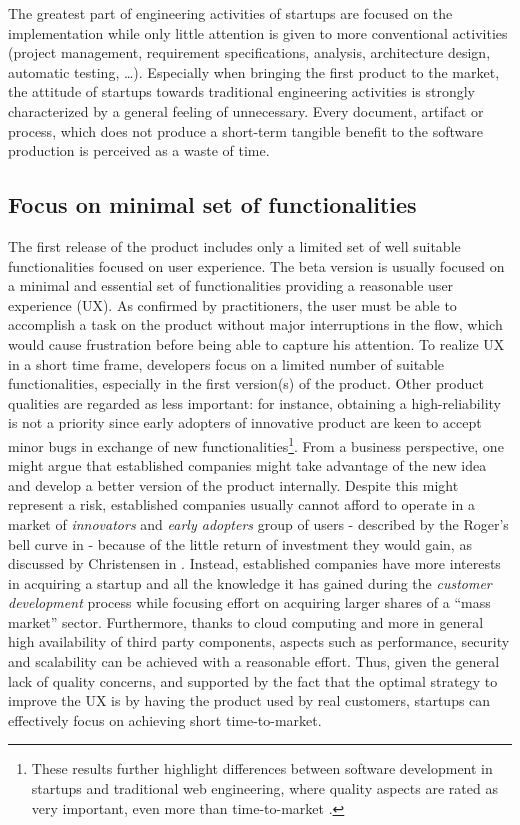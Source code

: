 \documentclass[10pt,journal,letterpaper,compsoc]{IEEEtran}
\begin{document}
The greatest part of engineering activities of startups are focused on 
the implementation while only little attention is given to more conventional 
activities (project management, requirement specifications, analysis, 
architecture design, automatic testing, \ldots). Especially when bringing the 
first product to the market, the attitude of startups towards traditional 
engineering activities is strongly characterized by a general feeling of 
unnecessary. Every document, artifact or process, which does not produce a 
short-term tangible benefit to the software production is perceived as a waste 
of time. 

\subsection{Focus on minimal set of functionalities}
The first release of the product includes only a limited set of well 
suitable functionalities focused on user experience. The beta version is usually 
focused on a minimal and essential set of functionalities providing a reasonable 
user experience (UX). As confirmed by practitioners, the user must be able to 
accomplish a task on the product without major interruptions in the flow, which 
would cause frustration before being able to capture his attention. To realize 
UX in a short time frame, developers focus on a limited number of suitable 
functionalities, especially in the first version(s) of the product. Other 
product qualities are regarded as less important: for instance, obtaining a 
high-reliability is not a priority since early adopters of innovative product 
are keen to accept minor bugs in exchange of new functionalities\footnote{These 
results further highlight differences between software development in startups 
and traditional web engineering, where quality aspects are rated as very 
important, even more than time-to-market \cite{Offutt2002}.}. From a business 
perspective, one might argue that established companies might take advantage of 
the new idea and develop a better version of the product internally. Despite 
this might represent a risk, established companies usually cannot afford to 
operate in a market of \textit{innovators} and \textit{early adopters} group of 
users - described by the Roger's bell curve in \cite{Rogers} - because of the 
little return of investment they would gain, as discussed by Christensen in 
\cite{Christensen2003}. Instead, established companies have more interests in 
acquiring a startup and all the knowledge it has gained during the 
\textit{customer development} process while focusing effort on acquiring larger 
shares of a ``mass market'' sector. Furthermore, thanks to cloud computing and 
more in general high availability of third party components, aspects such as 
performance, security and scalability can be achieved with a reasonable effort. 
Thus, given the general lack of quality concerns, and supported by the fact that 
the optimal strategy to improve the UX is by having the product used by real 
customers, startups can effectively focus on achieving short time-to-market.
\end{document}
